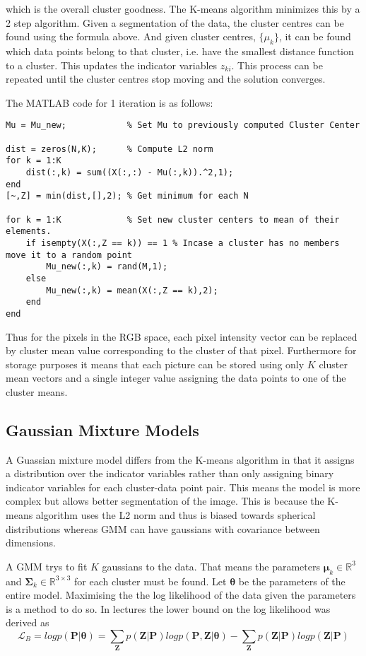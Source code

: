 \documentclass{article}
\newcommand{\RR}{\mathbb{R}}
\begin{document}
which is the overall cluster goodness. The K-means algorithm minimizes this by a 2 step algorithm. Given a segmentation of the data, the cluster centres can be found using the formula above. And given cluster centres, $\{ \mu_k \}$, it can be found which data points belong to that cluster, i.e. have the smallest distance function to a cluster. This updates the indicator variables $z_{k i}$. This process can be repeated until the cluster centres stop moving and the solution converges.

The MATLAB code for 1 iteration is as follows:

\begin{lstlisting}
Mu = Mu_new;            % Set Mu to previously computed Cluster Center

dist = zeros(N,K);      % Compute L2 norm
for k = 1:K
    dist(:,k) = sum((X(:,:) - Mu(:,k)).^2,1);
end
[~,Z] = min(dist,[],2); % Get minimum for each N

for k = 1:K             % Set new cluster centers to mean of their elements.
    if isempty(X(:,Z == k)) == 1 % Incase a cluster has no members move it to a random point
        Mu_new(:,k) = rand(M,1);
    else
        Mu_new(:,k) = mean(X(:,Z == k),2);
    end
end
\end{lstlisting}

Thus for the pixels in the RGB space, each pixel intensity vector can be replaced by cluster mean value corresponding to the cluster of that pixel. Furthermore for storage purposes it means that each picture can be stored using only $K$ cluster mean vectors and a single integer value assigning the data points to one of the cluster means.

\subsection{Gaussian Mixture Models}
A Guassian mixture model differs from the K-means algorithm in that it assigns a distribution over the indicator variables rather than only assigning binary indicator variables for each cluster-data point pair. This means the model is more complex but allows better segmentation of the image. This is because the K-means algorithm uses the L2 norm  and thus is biased towards spherical distributions whereas GMM can have gaussians with covariance between dimensions.

A GMM trys to fit $K$ gaussians to the data. That means the parameters $\boldsymbol{\mu}_k \in \RR^3$ and $\boldsymbol{\Sigma}_k \in \RR^{3\times 3}$ for each cluster must be found. Let $\boldsymbol{\theta}$ be the parameters of the entire model. Maximising the the log likelihood of the data given the parameters is a method to do so. In lectures the lower bound on the log likelihood was derived as
\begin{equation}
	\mathcal{L}_B = log p(\textbf{P}|\boldsymbol{\theta}) = \sum_\textbf{Z} p(\textbf{Z} | \textbf{P}) log p(\textbf{P},\textbf{Z}|\boldsymbol{\theta}) - \sum_\textbf{Z} p(\textbf{Z} | \textbf{P}) log p(\textbf{Z} | \textbf{P})
\end{equation}
\end{document}
